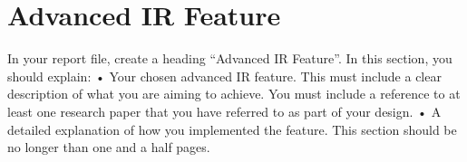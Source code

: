 
\section{Advanced IR Feature}

In your report file, create a heading “Advanced IR Feature”. In this section, you should explain:
• Your chosen advanced IR feature. This must include a clear description of what you are aiming to achieve. You must include a reference to at least one research paper that you have referred to as part of your design.
• A detailed explanation of how you implemented the feature. This section should be no longer than one and a half pages.
